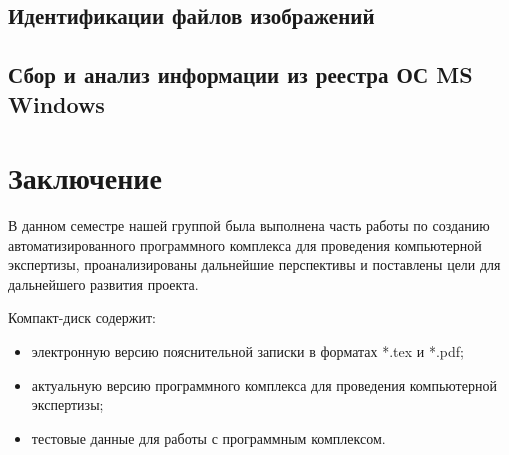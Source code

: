 \newpage
\subsection{Идентификации файлов изображений} %


\newpage 
\subsection{Сбор и анализ информации из реестра ОС MS Windows}


\newpage
\section*{Заключение}
В данном семестре нашей группой была выполнена часть работы по созданию автоматизированного программного комплекса для проведения компьютерной экспертизы, проанализированы дальнейшие перспективы и поставлены цели для дальнейшего развития проекта.
 
 
 \newpage
 \renewcommand{\refname}{Список использованных источников}
 

 Компакт-диск содержит: 
 \begin{itemize}
 \item электронную версию пояснительной записки в форматах *.tex и *.pdf;
 \item актуальную версию программного комплекса для проведения компьютерной экспертизы;
 \item тестовые данные для работы с программным комплексом.
 \end{itemize}
 

